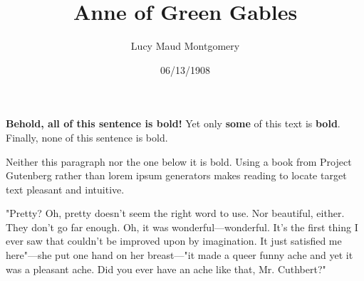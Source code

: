 \documentclass[a4paper]{article}
\title{Anne of Green Gables}
\author{Lucy Maud Montgomery}
\date{06/13/1908}
\begin{document}
\maketitle

\textbf{Behold, all of this sentence is bold!} Yet only \textbf{some} of this text is \textbf{bold}. Finally, none of this sentence is bold.

Neither this paragraph nor the one below it is bold. Using a book from Project Gutenberg rather than lorem ipsum generators makes reading to locate target text pleasant and intuitive.

"Pretty? Oh, pretty doesn't seem the right word to use. Nor beautiful, either. They don't go far enough. Oh, it was wonderful---wonderful. It's the first thing I ever saw that couldn't be improved upon by imagination. It just satisfied me here"---she put one hand on her breast---"it made a queer funny ache and yet it was a pleasant ache. Did you ever have an ache like that, Mr. Cuthbert?"
\end{document}
